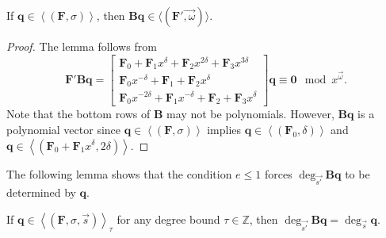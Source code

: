 \begin{lem}
\label{lem:qToBqOrder}If $\mathbf{q}\in\left\langle \left(\mathbf{F},\sigma\right)\right\rangle $,
then $\mathbf{B}\mathbf{q}\in\langle(\mathbf{F}'\vec{,\omega})\rangle$.\end{lem}
\begin{proof}
The lemma follows from 
\[
\mathbf{F}'\mathbf{B}\mathbf{q}=\left[\begin{array}{r}
\mathbf{F}_{0}+\mathbf{F}_{1}x^{\delta}+\mathbf{F}_{2}x^{2\delta}+\mathbf{F}_{3}x^{3\delta}\\
\mathbf{F}_{0}x^{-\delta}+\mathbf{F}_{1}+\mathbf{F}_{2}x^{\delta}\\
\mathbf{F}_{0}x^{-2\delta}+\mathbf{F}_{1}x^{-\delta}+\mathbf{F}_{2}+\mathbf{F}_{3}x^{\delta}
\end{array}\right]\mathbf{q}\equiv\mathbf{0}\mod x^{\vec{\omega}}.
\]
 Note that the bottom rows of $\mathbf{B}$ may not be polynomials.
However, $\mathbf{B}\mathbf{q}$ is a polynomial vector since $\mathbf{q}\in\left\langle \left(\mathbf{F},\sigma\right)\right\rangle $
implies $\mathbf{q}\in\left\langle \left(\mathbf{F}_{0},\delta\right)\right\rangle $
and $\mathbf{q}\in\left\langle \left(\mathbf{F}_{0}+\mathbf{F}_{1}x^{\delta},2\delta\right)\right\rangle $. 
\end{proof}
\noindent The following lemma shows that the condition $e\le1$ forces
$\deg_{\vec{s'}}\mathbf{B}\mathbf{q}$ to be determined by $\mathbf{q}$. 
\begin{lem}
\label{lem:qToBqDegree}If $\mathbf{q}\in\left\langle \left(\mathbf{F},\sigma,\vec{s}\right)\right\rangle _{\tau}$
for any degree bound $\tau\in\mathbb{Z}$, then $\deg_{\vec{s'}}\mathbf{B}\mathbf{q}=\deg_{\vec{s}}\mathbf{q}$.\end{lem}
